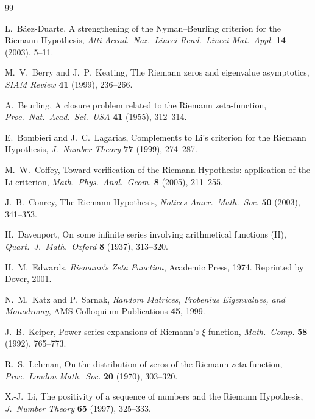 \documentclass[11pt,a4paper]{article}
\theoremstyle{definition}
\begin{document}
\begin{thebibliography}{99}

L.~B\'aez-Duarte, A strengthening of the Nyman--Beurling criterion for the Riemann Hypothesis, \emph{Atti Accad.\ Naz.\ Lincei Rend.\ Lincei Mat.\ Appl.} \textbf{14} (2003), 5--11.

M.~V.~Berry and J.~P.~Keating, The Riemann zeros and eigenvalue asymptotics, \emph{SIAM Review} \textbf{41} (1999), 236--266.

A.~Beurling, A closure problem related to the Riemann zeta-function, \emph{Proc.\ Nat.\ Acad.\ Sci.\ USA} \textbf{41} (1955), 312--314.

E.~Bombieri and J.~C.~Lagarias, Complements to Li's criterion for the Riemann Hypothesis, \emph{J.\ Number Theory} \textbf{77} (1999), 274--287.

M.~W.~Coffey, Toward verification of the Riemann Hypothesis: application of the Li criterion, \emph{Math.\ Phys.\ Anal.\ Geom.} \textbf{8} (2005), 211--255.

J.~B.~Conrey, The Riemann Hypothesis, \emph{Notices Amer.\ Math.\ Soc.} \textbf{50} (2003), 341--353.

H.~Davenport, On some infinite series involving arithmetical functions (II), \emph{Quart.\ J.\ Math.\ Oxford} \textbf{8} (1937), 313--320.

H.~M.~Edwards, \emph{Riemann's Zeta Function}, Academic Press, 1974. Reprinted by Dover, 2001.

N.~M.~Katz and P.~Sarnak, \emph{Random Matrices, Frobenius Eigenvalues, and Monodromy}, AMS Colloquium Publications \textbf{45}, 1999.

J.~B.~Keiper, Power series expansions of Riemann's $\xi$ function, \emph{Math.\ Comp.} \textbf{58} (1992), 765--773.

R.~S.~Lehman, On the distribution of zeros of the Riemann zeta-function, \emph{Proc.\ London Math.\ Soc.} \textbf{20} (1970), 303--320.

X.-J.~Li, The positivity of a sequence of numbers and the Riemann Hypothesis, \emph{J.\ Number Theory} \textbf{65} (1997), 325--333.


\end{thebibliography}
\end{document}
